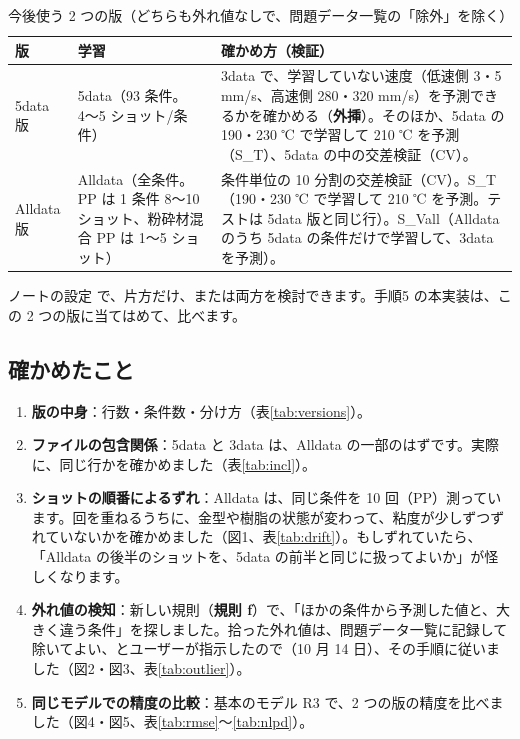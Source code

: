 \documentclass[paper=a4paper,fontsize=10.5pt,line_length=44zw,number_of_lines=38]{jlreq}
\newcommand{\file}[1]{\texttt{\detokenize{#1}}}
\begin{document}
\begin{table}[H]
\caption{今後使う 2 つの版（どちらも外れ値なしで、問題データ一覧の「除外」を除く）}
\begin{tabularx}{\linewidth}{@{}l>{\raggedright\arraybackslash}p{9\zw}>{\raggedright\arraybackslash}X@{}}
\toprule
版 & 学習 & 確かめ方（検証） \\
\midrule
5data 版 & 5data（93 条件。4〜5 ショット/条件） & 3data で、学習していない速度（低速側 3・5 mm/s、高速側 280・320 mm/s）を予測できるかを確かめる（\textbf{外挿}）。そのほか、5data の 190・230 ℃ で学習して 210 ℃ を予測（S\_T）、5data の中の交差検証（CV）。 \\
Alldata 版 & Alldata（全条件。PP は 1 条件 8〜10 ショット、粉砕材混合 PP は 1〜5 ショット） & 条件単位の 10 分割の交差検証（CV）。S\_T（190・230 ℃ で学習して 210 ℃ を予測。テストは 5data 版と同じ行）。S\_Vall（Alldata のうち 5data の条件だけで学習して、3data を予測）。 \\
\bottomrule
\end{tabularx}
\end{table}

ノートの設定 \file{DATA\_VERSIONS} で、片方だけ、または両方を検討できます。手順5 の本実装は、この 2 つの版に当てはめて、比べます。

\subsection{確かめたこと}
\begin{enumerate}[itemsep=0.4ex,topsep=0.5ex]
\item \textbf{版の中身}：行数・条件数・分け方（表\ref{tab:versions}）。
\item \textbf{ファイルの包含関係}：5data と 3data は、Alldata の一部のはずです。実際に、同じ行かを確かめました（表\ref{tab:incl}）。
\item \textbf{ショットの順番によるずれ}：Alldata は、同じ条件を 10 回（PP）測っています。回を重ねるうちに、金型や樹脂の状態が変わって、粘度が少しずつずれていないかを確かめました（図1、表\ref{tab:drift}）。もしずれていたら、「Alldata の後半のショットを、5data の前半と同じに扱ってよいか」が怪しくなります。
\item \textbf{外れ値の検知}：新しい規則（\textbf{規則 f}）で、「ほかの条件から予測した値と、大きく違う条件」を探しました。拾った外れ値は、問題データ一覧に記録して除いてよい、とユーザーが指示したので（10 月 14 日）、その手順に従いました（図2・図3、表\ref{tab:outlier}）。
\item \textbf{同じモデルでの精度の比較}：基本のモデル R3 で、2 つの版の精度を比べました（図4・図5、表\ref{tab:rmse}〜\ref{tab:nlpd}）。
\end{enumerate}
\end{document}
